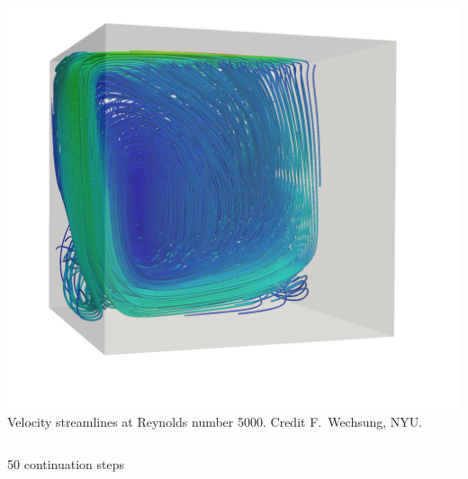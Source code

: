 \documentclass[presentation,aspectratio=43, 10pt]{beamer}
\begin{document}
\begin{frame}[t]
\begin{columns}
\begin{column}{0.5\textwidth}
{        \includegraphics[width=\textwidth]{LDC-streamlines}}
      {\scriptsize Velocity streamlines at Reynolds number 5000.
        Credit F.~Wechsung, NYU.}
    \end{column}
  \end{columns}
  \begin{center}
    50 continuation steps
  \end{center}
\end{frame}
\end{document}
